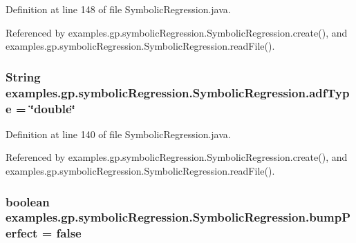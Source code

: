 Definition at line 148 of file Symbolic\-Regression.\-java.



Referenced by examples.\-gp.\-symbolic\-Regression.\-Symbolic\-Regression.\-create(), and examples.\-gp.\-symbolic\-Regression.\-Symbolic\-Regression.\-read\-File().

\hypertarget{classexamples_1_1gp_1_1symbolic_regression_1_1_symbolic_regression_a66848d80715e58f5287c6a1278c1debf}{
\subsubsection[{adf\-Type}]{\setlength{\rightskip}{0pt plus 5cm}String examples.\-gp.\-symbolic\-Regression.\-Symbolic\-Regression.\-adf\-Type = \char`\"{}double\char`\"{}\hspace{0.3cm}{\ttfamily [static]}}}\label{classexamples_1_1gp_1_1symbolic_regression_1_1_symbolic_regression_a66848d80715e58f5287c6a1278c1debf}


Definition at line 140 of file Symbolic\-Regression.\-java.



Referenced by examples.\-gp.\-symbolic\-Regression.\-Symbolic\-Regression.\-create(), and examples.\-gp.\-symbolic\-Regression.\-Symbolic\-Regression.\-read\-File().

\hypertarget{classexamples_1_1gp_1_1symbolic_regression_1_1_symbolic_regression_aed2c9425ba0dee6ce09506ec67377b80}{
\subsubsection[{bump\-Perfect}]{\setlength{\rightskip}{0pt plus 5cm}boolean examples.\-gp.\-symbolic\-Regression.\-Symbolic\-Regression.\-bump\-Perfect = false\hspace{0.3cm}{\ttfamily [static]}}}\label{classexamples_1_1gp_1_1symbolic_regression_1_1_symbolic_regression_aed2c9425ba0dee6ce09506ec67377b80}


